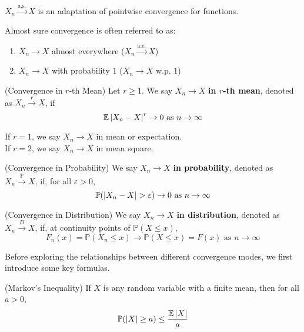 \documentclass{huhtakm-template-book}
\newcommand{\prob}{\mathbb{P}}
\newcommand{\expect}{\mathbb{E}}
\begin{document}
    \begin{rem}
        $X_{n}\xrightarrow{\text{a.s.}}X$ is an adaptation of pointwise convergence for functions.
    \end{rem}
    \begin{rem}
        Almost sure convergence is often referred to as:
        \begin{enumerate}
            \item $X_{n}\to X$ almost everywhere ($X_{n}\xrightarrow{\text{a.e.}}X$)
            \item $X_{n}\to X$ with probability $1$ ($X_{n}\to X$ w.p. $1$)
        \end{enumerate}
    \end{rem}
    \begin{defn}(Convergence in $r$-th Mean)
        Let $r\geq 1$. We say $X_{n}\to X$ \textbf{in $r$-th mean}, denoted as $X_{n}\xrightarrow{r}X$, if
        \begin{equation*}
            \expect\abs{X_{n}-X}^{r}\to 0\text{ as }n\to\infty
        \end{equation*}
    \end{defn}
    \begin{eg}
        If $r=1$, we say $X_{n}\to X$ in mean or expectation.\\
        If $r=2$, we say $X_{n}\to X$ in mean square.
    \end{eg}
    \begin{defn}(Convergence in Probability)
        We say $X_{n}\to X$ \textbf{in probability}, denoted as $X_{n}\xrightarrow{\prob}X$, if, for all $\varepsilon>0$,
        \begin{equation*}
            \prob(\abs{X_{n}-X}>\varepsilon)\to 0\text{ as }n\to\infty
        \end{equation*}
    \end{defn}
    \begin{defn}(Convergence in Distribution)
        We say $X_{n}\to X$ \textbf{in distribution}, denoted as $X_{n}\xrightarrow{D}X$, if, at continuity points of $\prob(X\leq x)$,
        \begin{equation*}
            F_{n}(x)=\prob(X_{n}\leq x)\to\prob(X\leq x)=F(x)\text{ as }n\to\infty
        \end{equation*}
    \end{defn}
    Before exploring the relationships between different convergence modes, we first introduce some key formulas.
    \begin{lem}(Markov's Inequality)
        If $X$ is any random variable with a finite mean, then for all $a>0$,
        \begin{equation*}
            \prob(\abs{X}\geq a)\leq\frac{\expect\abs{X}}{a}
        \end{equation*}
    \end{lem}
\end{document}
